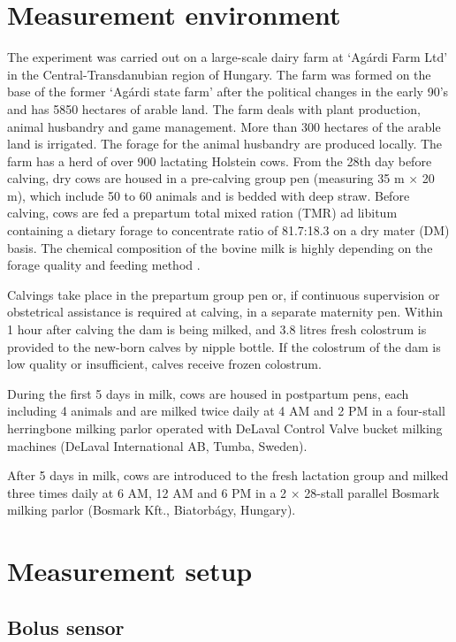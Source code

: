 \documentclass[conference]{IEEEtran}
\begin{document}
\section{Measurement environment}

The experiment was carried out on a large-scale dairy farm at ‘Agárdi Farm Ltd’ in the Central-Transdanubian region of Hungary. The farm was formed on the base of the former ‘Agárdi state farm’ after the political changes in the early 90’s and has 5850 hectares of arable land. The farm deals with plant production, animal husbandry and game management. More than 300 hectares of the arable land is irrigated. The forage for the animal husbandry are produced locally.
The farm has a herd of over 900 lactating Holstein cows. From the 28th day before calving, dry cows are housed in a pre-calving group pen (measuring 35 m × 20 m), which include 50 to 60 animals and is bedded with deep straw. Before calving, cows are fed a prepartum total mixed ration (TMR) ad libitum containing a dietary forage to concentrate ratio of 81.7:18.3 on a dry mater (DM) basis. The chemical composition of the bovine milk is highly depending on the forage quality and feeding method \cite{aidin2019}.

Calvings take place in the prepartum group pen or, if continuous supervision or obstetrical assistance is required at calving, in a separate maternity pen. Within 1 hour after calving the dam is being milked, and 3.8 litres fresh colostrum is provided to the new-born calves by nipple bottle. If the colostrum of the dam is low quality or insufficient, calves receive frozen colostrum.

During the first 5 days in milk, cows are housed in postpartum pens, each including 4 animals and are milked twice daily at 4 AM and 2 PM in a four-stall herringbone milking parlor operated with DeLaval Control Valve bucket milking machines (DeLaval International AB, Tumba, Sweden).

After 5 days in milk, cows are introduced to the fresh lactation group and milked three times daily at 6 AM, 12 AM and 6 PM in a 2 × 28-stall parallel Bosmark milking parlor (Bosmark Kft., Biatorbágy, Hungary).

\section{Measurement setup}

\subsection{Bolus sensor}
\end{document}
